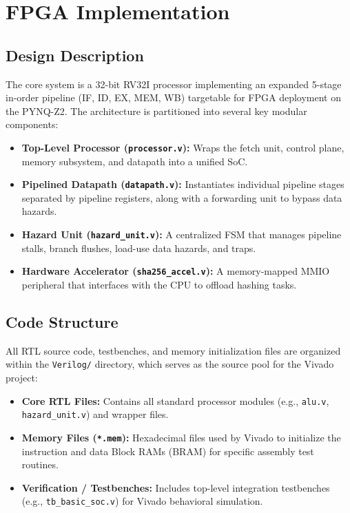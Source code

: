 \documentclass[11pt,a4paper]{article}
\begin{document}
\section{FPGA Implementation}

\subsection{Design Description}
The core system is a 32-bit RV32I processor implementing an expanded 5-stage in-order pipeline (IF, ID, EX, MEM, WB) targetable for FPGA deployment on the PYNQ-Z2. %
The architecture is partitioned into several key modular components:
\begin{itemize}
    \item \textbf{Top-Level Processor (\texttt{processor.v}):} Wraps the fetch unit, control plane, memory subsystem, and datapath into a unified SoC. %
    \item \textbf{Pipelined Datapath (\texttt{datapath.v}):} Instantiates individual pipeline stages separated by pipeline registers, along with a forwarding unit to bypass data hazards. %
    \item \textbf{Hazard Unit (\texttt{hazard\_unit.v}):} A centralized FSM that manages pipeline stalls, branch flushes, load-use data hazards, and traps. %
    \item \textbf{Hardware Accelerator (\texttt{sha256\_accel.v}):} A memory-mapped MMIO peripheral that interfaces with the CPU to offload hashing tasks. %
\end{itemize}

\subsection{Code Structure}
All RTL source code, testbenches, and memory initialization files are organized within the \texttt{Verilog/} directory, which serves as the source pool for the Vivado project:
\begin{itemize}
    \item \textbf{Core RTL Files:} Contains all standard processor modules (e.g., \texttt{alu.v}, \texttt{hazard\_unit.v}) and wrapper files. %
    \item \textbf{Memory Files (\texttt{*.mem}):} Hexadecimal files used by Vivado to initialize the instruction and data Block RAMs (BRAM) for specific assembly test routines. %
    \item \textbf{Verification / Testbenches:} Includes top-level integration testbenches (e.g., \texttt{tb\_basic\_soc.v}) for Vivado behavioral simulation. %
\end{itemize}
\end{document}
